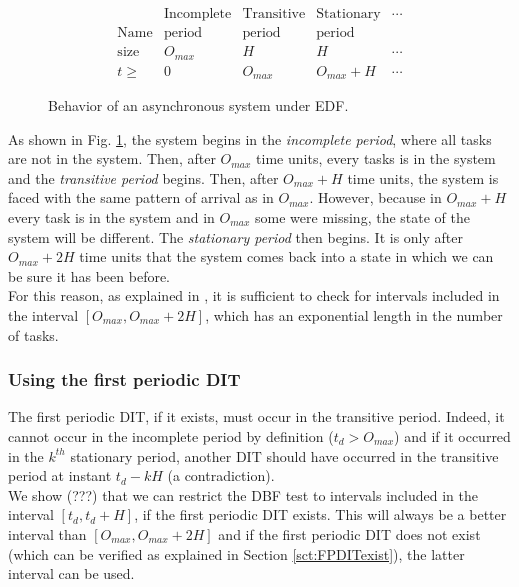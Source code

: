 \documentclass[times, 10pt,twocolumn, a4paper]{article}
\begin{document}
\begin{figure}[h]
	\[
		\begin{array}{r||c|c|c|l}
			& \text{Incomplete} & \text{Transitive} & \text{Stationary} & \cdots \\
			\text{Name} & \text{period} & \text{period} & \text{period}  & \\
			\hline
			\text{size} & O_{max} & H & H & \cdots \\
			\hline
			t \geqslant & 0 & O_{max} & O_{max} + H & \cdots
		\end{array}
	\]
	\begin{center}
	\caption{Behavior of an asynchronous system under EDF.}
	\label{fig:asyncBehavior}
	\end{center}
\end{figure}

As shown in Fig. \ref{fig:asyncBehavior}, the system begins in the \emph{incomplete period}, where all tasks are not in the system. Then, after $O_{max}$ time units, every tasks is in the system and the \emph{transitive period} begins. Then, after $O_{max} + H$ time units, the system is faced with the same pattern of arrival as in $O_{max}$. However, because in $O_{max} + H$ every task is in the system and in $O_{max}$ some were missing, the state of the system will be different. The \emph{stationary period} then begins. It is only after $O_{max} + 2H$ time units that the system comes back into a state in which we can be sure it has been before.\\

For this reason, as explained in \cite{leung1982complexity}, it is sufficient to check for intervals included in the interval $[O_{max}, O_{max} + 2H]$, which has an exponential length in the number of tasks.

\subsubsection{Using the first periodic DIT}

The first periodic DIT, if it exists, must occur in the transitive period. Indeed, it cannot occur in the incomplete period by definition ($t_d > O_{max}$) and if it occurred in the $k^{th}$ stationary period, another DIT should have occurred in the transitive period at instant $t_d - k H$ (a contradiction).\\

We show (???) that we can restrict the DBF test to intervals included in the interval $[t_d, t_d + H]$, if the first periodic DIT exists. This will always be a better interval than $[O_{max}, O_{max} + 2H]$ and if the first periodic DIT does not exist (which can be verified as explained in Section \ref{sct:FPDITexist}), the latter interval can be used.\\
\end{document}

